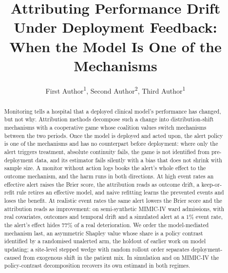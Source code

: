 \documentclass[letterpaper]{article} %
\title{Attributing Performance Drift Under Deployment Feedback: When the Model Is One of the Mechanisms}
\author{
    First Author\textsuperscript{\rm 1},
    Second Author\textsuperscript{\rm 2},
    Third Author\textsuperscript{\rm 1}
}
\begin{document}
\maketitle

\begin{abstract}
Monitoring tells a hospital that a deployed clinical model's performance has
changed, but not why. Attribution methods decompose such a change into
distribution-shift mechanisms with a cooperative game whose coalition values
switch mechanisms between the two periods. Once the model is deployed and
acted upon, the alert policy is one of the mechanisms and has no counterpart
before deployment: where only the alert triggers treatment, absolute
continuity fails, the game is not identified from pre-deployment data, and
its estimator fails silently with a bias that does not shrink with sample
size. A monitor without action logs books the alert's whole effect to the
outcome mechanism, and the harm runs in both directions. At high event rates
an effective alert raises the Brier score, the attribution reads as outcome
drift, a keep-or-refit rule retires an effective model, and naive refitting
learns the prevented events and loses the benefit. At realistic event rates
the same alert lowers the Brier score and the attribution reads as
improvement: on semi-synthetic MIMIC-IV ward admissions, with real
covariates, outcomes and temporal drift and a simulated alert at a $1\%$
event rate, the alert's effect hides $77\%$ of a real deterioration. We order
the model-mediated mechanism last, an asymmetric Shapley value whose share is
a policy contrast identified by a randomised unalerted arm, the holdout of
earlier work on model updating; a site-level stepped wedge with random
rollout order separates deployment-caused from exogenous shift in the patient
mix. In simulation and on MIMIC-IV the policy-contrast decomposition recovers
its own estimand in both regimes.
\end{abstract}
\end{document}
